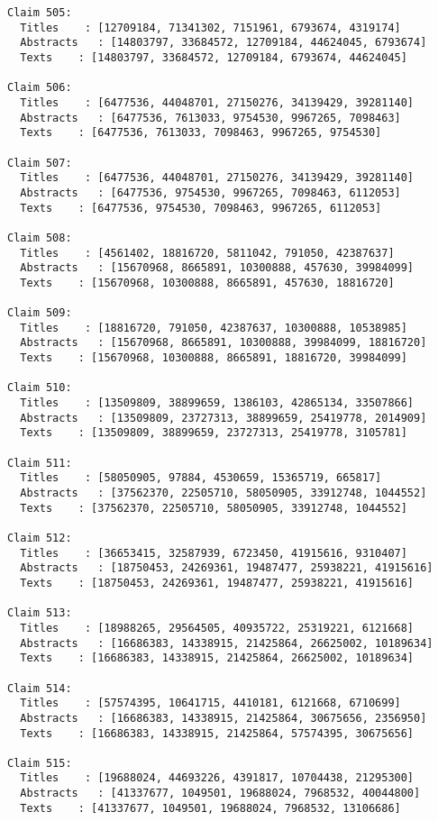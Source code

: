 \documentclass[11pt]{article}
\begin{document}
\begin{Verbatim}[commandchars=\\\{\}]
Claim 505:
  Titles    : [12709184, 71341302, 7151961, 6793674, 4319174]
  Abstracts   : [14803797, 33684572, 12709184, 44624045, 6793674]
  Texts    : [14803797, 33684572, 12709184, 6793674, 44624045]

Claim 506:
  Titles    : [6477536, 44048701, 27150276, 34139429, 39281140]
  Abstracts   : [6477536, 7613033, 9754530, 9967265, 7098463]
  Texts    : [6477536, 7613033, 7098463, 9967265, 9754530]

Claim 507:
  Titles    : [6477536, 44048701, 27150276, 34139429, 39281140]
  Abstracts   : [6477536, 9754530, 9967265, 7098463, 6112053]
  Texts    : [6477536, 9754530, 7098463, 9967265, 6112053]

Claim 508:
  Titles    : [4561402, 18816720, 5811042, 791050, 42387637]
  Abstracts   : [15670968, 8665891, 10300888, 457630, 39984099]
  Texts    : [15670968, 10300888, 8665891, 457630, 18816720]

Claim 509:
  Titles    : [18816720, 791050, 42387637, 10300888, 10538985]
  Abstracts   : [15670968, 8665891, 10300888, 39984099, 18816720]
  Texts    : [15670968, 10300888, 8665891, 18816720, 39984099]

Claim 510:
  Titles    : [13509809, 38899659, 1386103, 42865134, 33507866]
  Abstracts   : [13509809, 23727313, 38899659, 25419778, 2014909]
  Texts    : [13509809, 38899659, 23727313, 25419778, 3105781]

Claim 511:
  Titles    : [58050905, 97884, 4530659, 15365719, 665817]
  Abstracts   : [37562370, 22505710, 58050905, 33912748, 1044552]
  Texts    : [37562370, 22505710, 58050905, 33912748, 1044552]

Claim 512:
  Titles    : [36653415, 32587939, 6723450, 41915616, 9310407]
  Abstracts   : [18750453, 24269361, 19487477, 25938221, 41915616]
  Texts    : [18750453, 24269361, 19487477, 25938221, 41915616]

Claim 513:
  Titles    : [18988265, 29564505, 40935722, 25319221, 6121668]
  Abstracts   : [16686383, 14338915, 21425864, 26625002, 10189634]
  Texts    : [16686383, 14338915, 21425864, 26625002, 10189634]

Claim 514:
  Titles    : [57574395, 10641715, 4410181, 6121668, 6710699]
  Abstracts   : [16686383, 14338915, 21425864, 30675656, 2356950]
  Texts    : [16686383, 14338915, 21425864, 57574395, 30675656]

Claim 515:
  Titles    : [19688024, 44693226, 4391817, 10704438, 21295300]
  Abstracts   : [41337677, 1049501, 19688024, 7968532, 40044800]
  Texts    : [41337677, 1049501, 19688024, 7968532, 13106686]


\end{Verbatim}
\end{document}
